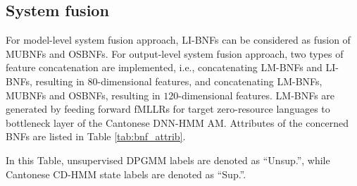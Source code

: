 \documentclass[a4paper]{article}
\newcommand{\quotes}[1]{``#1''}
\begin{document}
\subsection{System fusion}
For model-level system fusion approach, LI-BNFs can be considered as fusion of MUBNFs and OSBNFs. For output-level system fusion approach, two types of feature concatenation are implemented, i.e., concatenating LM-BNFs and LI-BNFs, resulting in $80$-dimensional features, and concatenating LM-BNFs, MUBNFs and OSBNFs, resulting in $120$-dimensional features. LM-BNFs are generated by feeding forward fMLLRs for target zero-resource languages to bottleneck layer of the Cantonese DNN-HMM AM. Attributes of the concerned BNFs  
are listed in Table \ref{tab:bnf_attrib}. 
\begin{table}[htbp]
\renewcommand\arraystretch{1}
\centering
\caption{Attributes of LM-BNF, MUBNF, OSBNF and LM-BNF}
\label{tab:bnf_attrib}
\end{table}
In this Table, unsupervised DPGMM labels are denoted as \quotes{Unsup.}, while Cantonese CD-HMM state labels are denoted as \quotes{Sup.}.
\end{document}
